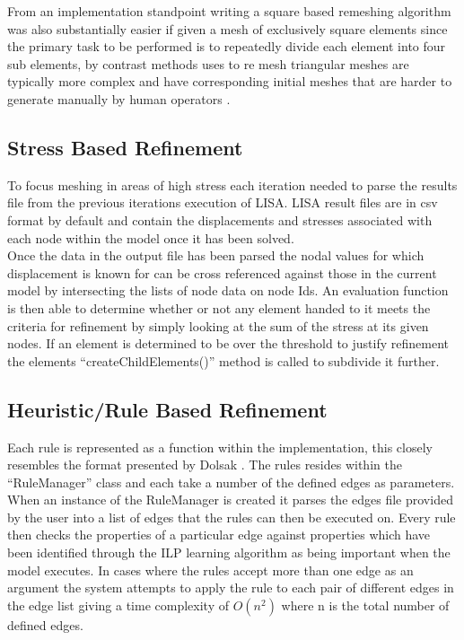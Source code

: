 \noindent
From an implementation standpoint writing a square based remeshing algorithm was also substantially easier if given a mesh of exclusively square elements since the primary task to be performed is to repeatedly divide each element into four sub elements, by contrast methods uses to re mesh triangular meshes are typically more complex and have corresponding initial meshes that are harder to generate manually by human operators \cite{HandMeshing}. \\ 



\subsection{Stress Based Refinement}
To focus meshing in areas of high stress each iteration needed to parse the results file from the previous iterations execution of LISA. LISA result files are in csv format by default and contain the displacements and stresses associated with each node within the model once it has been solved. \\

\noindent
Once the data in the output file has been parsed the nodal values for which displacement is known for can be cross referenced against those in the current model by intersecting the lists of node data on node Ids. An evaluation function is then able to determine whether or not any element handed to it meets the criteria for refinement by simply looking at the sum of the stress at its given nodes. If an element is determined to be over the threshold to justify refinement the elements ``createChildElements()'' method is called to subdivide it further. \\


\subsection{Heuristic/Rule Based Refinement}
Each rule is represented as a function within the implementation, this closely resembles the format presented by Dolsak \cite{DolsakPaper91, DolsakPaper94, appOfILPToFEMeshDesign} \cite{ConsultRuleIntelltSystemFE}. The rules resides within the ``RuleManager'' class and each take a number of the defined edges as parameters. When an instance of the RuleManager is created it parses the edges file provided by the user into a list of edges that the rules can then be executed on. Every rule then checks the properties of a particular edge against properties which have been identified through the ILP learning algorithm as being important when the model executes. In cases where the rules accept more than one edge as an argument the system attempts to apply the rule to each pair of different edges in the edge list giving a time complexity of $O(n^2)$ where n is the total number of defined edges.\\

